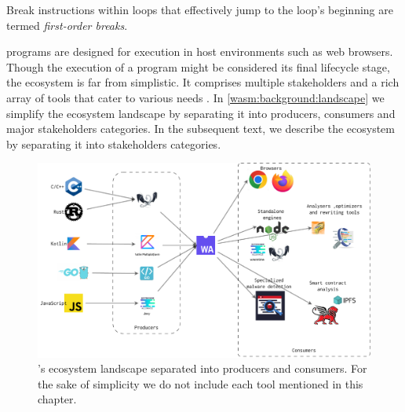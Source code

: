 \begin{definition}\label{first_order_jump}
Break instructions within loops that effectively jump to the loop's beginning are termed \emph{first-order breaks}.
\end{definition}


\label{background:wasm:ecosystems}



\Wasm programs are designed for execution in host environments such as web browsers.
Though the execution of a \Wasm program might be considered its final lifecycle stage, the \Wasm ecosystem is far from simplistic.
It comprises multiple stakeholders and a rich array of tools that cater to various needs \cite{Avenger}.
In \autoref{wasm:background:landscape} we simplify the ecosystem landscape by separating it into producers, consumers and major stakeholders categories.
In the subsequent text, we describe the \Wasm ecosystem by separating it into stakeholders categories.

\begin{figure}
    \centering
    \includegraphics[width=1.0\linewidth]{figures/landscape2.pdf}
    \caption{\Wasm's ecosystem landscape separated into producers and consumers. For the sake of simplicity we do not include each tool mentioned in this chapter.}
    \label{wasm:background:landscape}
\end{figure}

